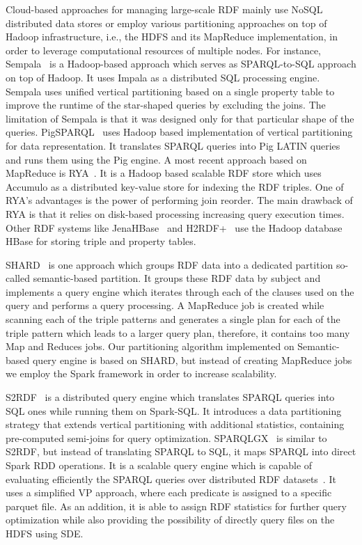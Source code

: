 Cloud-based approaches for managing large-scale \gls{RDF} mainly use NoSQL distributed data stores or employ various partitioning approaches on top of Hadoop infrastructure, i.e., the \gls{HDFS} and its MapReduce implementation, in order to leverage computational resources of multiple nodes. 
For instance, Sempala~\cite{Schatzle2014Sempala} is a Hadoop-based approach which serves as SPARQL-to-SQL approach on top of Hadoop.
It uses Impala as a distributed SQL processing engine. 
Sempala uses unified vertical partitioning based on a single property table to improve the runtime of the star-shaped queries by excluding the joins. 
The limitation of Sempala is that it was designed only for that particular shape of the queries.
PigSPARQL~\cite{Schatzle2011PMS} uses Hadoop based implementation of vertical partitioning for data representation. 
It translates \gls{SPARQL} queries into Pig LATIN queries and runs them using the Pig engine.
A most recent approach based on MapReduce is RYA~\cite{Punnoose2012Rya}.
It is a Hadoop based scalable \gls{RDF} store which uses Accumulo as a distributed key-value store for indexing the \gls{RDF} triples.
One of RYA's advantages is the power of performing join reorder. 
The main drawback of RYA is that it relies on disk-based processing increasing query execution times.
Other \gls{RDF} systems like JenaHBase~\cite{KhadilkarKTC2012} and H2RDF+~\cite{PapailiouKTKK13} use the Hadoop database HBase for storing triple and property tables.

SHARD~\cite{Rohloff2010SHARD} is one approach which groups \gls{RDF} data into a dedicated partition so-called semantic-based partition.  
It groups these \gls{RDF} data by subject and implements a query engine which iterates through each of the clauses used on the query and performs a query processing. 
A MapReduce job is created while scanning each of the triple patterns and generates a single plan for each of the triple pattern which leads to a larger query plan, therefore, it contains too many Map and Reduces jobs. 
Our partitioning algorithm implemented on Semantic-based query engine is based on SHARD, but instead of creating MapReduce jobs we employ the Spark framework in order to increase scalability.

S2RDF~\cite{Schatzle:2016:SRQ:2977797.2977806} is a distributed query engine which translates \gls{SPARQL} queries into SQL ones while running them on Spark-SQL. 
It introduces a data partitioning strategy that extends vertical partitioning with additional statistics, containing pre-computed semi-joins for query optimization.
SPARQLGX~\cite{sparqlgx-iswc-2016} is similar to S2RDF, but instead of translating \gls{SPARQL} to SQL, it maps \gls{SPARQL} into direct Spark \gls{RDD} operations. 
It is a scalable query engine which is capable of evaluating efficiently the \gls{SPARQL} queries over distributed \gls{RDF} datasets~\cite{graux2018multi}.
It uses a simplified VP approach, where each predicate is assigned to a specific parquet file. 
As an addition, it is able to assign \gls{RDF} statistics for further query optimization while also providing the possibility of directly query files on the \gls{HDFS} using SDE.
